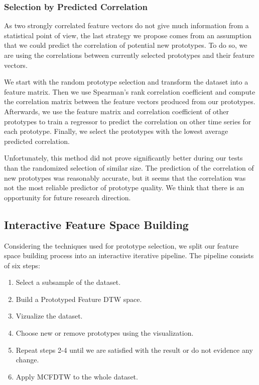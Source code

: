 \subsubsection{Selection by Predicted Correlation}
As two strongly correlated feature vectors do not give much information from a statistical point of view, the last strategy we propose comes from an assumption that we could predict the correlation of potential new prototypes. To do so, we are using the correlations between currently selected prototypes and their feature vectors.

We start with the random prototype selection and transform the dataset into a feature matrix. Then we use Spearman's rank correlation coefficient and compute the correlation matrix between the feature vectors produced from our prototypes. Afterwards, we use the feature matrix and correlation coefficient of other prototypes to train a regressor to predict the correlation on other time series for each prototype. Finally, we select the prototypes with the lowest average predicted correlation.

Unfortunately, this method did not prove significantly better during our tests than the randomized selection of similar size. The prediction of the correlation of new prototypes was reasonably accurate, but it seems that the correlation was not the most reliable predictor of prototype quality. We think that there is an opportunity for future research direction.

\subsection{Interactive Feature Space Building}
\label{sec:inter-fsb}
Considering the techniques used for prototype selection, we split our feature space building process into an interactive iterative pipeline. The pipeline consists of six steps:
\begin{enumerate}
    \item Select a subsample of the dataset.
    \item Build a Prototyped Feature DTW space.
    \item Vizualize the dataset.
    \item Choose new or remove prototypes using the visualization.
    \item Repeat steps 2-4 until we are satisfied with the result or do not evidence any change.
    \item Apply MCFDTW to the whole dataset.
\end{enumerate}

